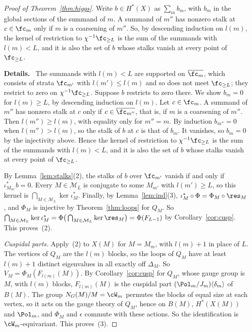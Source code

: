 \documentclass[11pt]{amsart}
\newenvironment{details}{\par\color{black!60!green}\noindent\textbf{Details.}\ }{\par}
\begin{document}
\begin{proof}[Proof of Theorem~\ref{thm:higgs}]
Write $b\in H^*(X)$ as $\sum_mb_m$, with $b_m$ in the global sections of the
summand of $m$.  A summand of $m''$ has nonzero stalk at $c\in\fc_m$ only if
$m$ is a coarsening of $m''$.  So, by descending induction on $l(m)$, the
kernel of restriction to $\chi^{-1}\fc_{\ge L}$ is the sum of the summands
with $l(m)<L$, and it is also the set of $b$ whose stalks vanish at every
point of $\fc_{\ge L}$.
\begin{details}
The summands with $l(m)<L$ are supported on
$\overline{\fc_m}$, which consists of strata $\fc_{m'}$ with $l(m')\le l(m)$
and so does not meet $\fc_{\ge L}$; they restrict to zero on
$\chi^{-1}\fc_{\ge L}$.  Suppose $b$ restricts to zero there.  We show
$b_m=0$ for $l(m)\ge L$, by descending induction on $l(m)$.  Let $c\in\fc_m$.
A summand of $m''$ has nonzero stalk at $c$ only if $c\in\overline{\fc_{m''}}$,
that is, if $m$ is a coarsening of $m''$.  Then $l(m'')\ge l(m)$, with equality
only for $m''=m$.  By induction $b_{m''}=0$ when $l(m'')>l(m)$, so the stalk of
$b$ at $c$ is that of $b_m$.  It vanishes, so $b_m=0$ by the injectivity
above.  Hence the kernel of restriction to $\chi^{-1}\fc_{\ge L}$ is the sum
of the summands with $l(m)<L$, and it is also the set of $b$ whose stalks
vanish at every point of $\fc_{\ge L}$.
\end{details}
By Lemma~\ref{lem:stalks}(2), the
stalks of $b$ over $\fc_{m'}$ vanish if and only if $\iota_{M_{m'}}^*b=0$.
Every $M\in\mathcal M_L$ is conjugate to some $M_{m'}$ with $l(m')\ge L$, so
this kernel is $\bigcap_{M\in\mathcal M_L}\ker\iota_M^*$.  Finally, by
Lemma~\ref{lem:ind}(3), $\iota_M^*\circ\Phi=\Phi_M\circ\res_M$, and $\Phi_M$ is
injective by Theorem~\ref{thm:loops} for $Q_M$.  So
$\bigcap_{M\in\mathcal M_L}\ker\iota_M^*=\Phi\big(\bigcap_{M\in\mathcal
M_L}\ker\res_M\big)=\Phi(F_{L-1})$ by Corollary~\ref{cor:cusp}.  This
proves~(2).

\emph{Cuspidal parts.}  Apply~(2) to $X(M)$ for $M=M_m$, with $l(m)+1$ in
place of $L$.  The vertices of $Q_M$ are the $l(m)$ blocks, so the loops of
$Q_M$ have at least $l(m)+1$ distinct eigenvalues in all exactly off
$\Delta_M$.  So $V_M=\Phi_M(F_{l(m)}(M))$.  By Corollary~\ref{cor:cusp} for
$Q_M$, whose gauge group is $M$, with $l(m)$ blocks, $F_{l(m)}(M)$ is the
cuspidal part $(\Pol_m/J_m)\langle\delta_m\rangle$ of $B(M)$.  The group $N_G(M)/M=\cW_m$ permutes the blocks of
equal size at each vertex, so it acts on the gauge theory of $Q_M$, hence on
$B(M)$, $H^*(X(M))$ and $\Pol_m$, and $\Phi_M$ and $\epsilon$ commute with these
actions.  So the identification is $\cW_m$-equivariant.  This proves~(3).
\end{proof}
\end{document}
